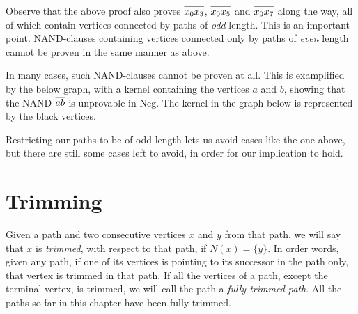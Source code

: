 Observe that the above proof also proves $\ol{x_0x_3}$, $\ol{x_0x_5}$ and $\ol{x_0x_7}$ along the way, all of which contain vertices connected by paths of \textit{odd} length.
This is an important point.
NAND-clauses containing vertices connected only by paths of \textit{even} length cannot be proven in the same manner as above.

In many cases, such NAND-clauses cannot be proven at all.
This is examplified by the below graph, with a kernel containing the vertices $a$ and $b$, showing that the NAND $\ol{ab}$ is unprovable in Neg.
The kernel in the graph below is represented by the black vertices.

\begin{figure}[!h]
  \centering
  \caption{}
  \label{fig:kernel_even}
\end{figure}

Restricting our paths to be of odd length lets us avoid cases like the one above, but there are still some cases left to avoid, in order for our implication to hold.

\section{Trimming}
\label{sec:Trimming}
Given a path and two consecutive vertices $x$ and $y$ from that path, we will say that $x$ is \textit{trimmed}, with respect to that path, if $N(x) = \{y\}$.
In order words, given any path, if one of its vertices is pointing to its successor in the path only, that vertex is trimmed in that path.
If all the vertices of a path, except the terminal vertex, is trimmed, we will call the path a \textit{fully trimmed path}.
All the paths so far in this chapter have been fully trimmed.

